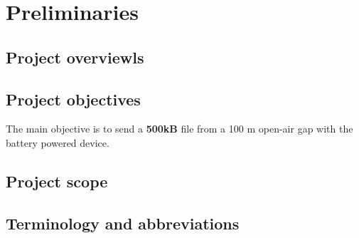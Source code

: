 \newpage

\section*{Preliminaries}\label{00Sec:Preliminaries}

\renewcommand{\thesubsection}{\roman{subsection}}
\subsection{Project overviewls}\label{01Sub:ProjectOverview}




\subsection{Project objectives}\label{01Sub:ProjectObjectives}


The main objective is to send a \textbf{500kB} file from a 100 m open-air gap with
the battery powered device.




\subsection{Project scope}\label{01Sub:Project Scope}




\subsection{Terminology and abbreviations}\label{01Sub:TerminologyAndAbbreviations}





\renewcommand{\thesubsection}{\arabic{subsection}}